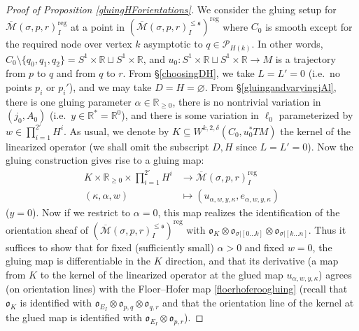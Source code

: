 \documentclass[12pt]{article}
\theoremstyle{definition}
\theoremstyle{remark}
\numberwithin{equation}{subsection}
\newcommand{\s}{\mathfrak s}
\newcommand{\oo}{\mathfrak o}
\newcommand{\RR}{\mathbb R}
\newcommand{\PPP}{\mathcal P}
\newcommand{\Mbar}{\overline{\mathcal M}}
\newcommand{\reg}{\mathrm{reg}}
\begin{document}
\begin{proof}[Proof of Proposition \ref{gluingHForientations}]
We consider the gluing setup for $\Mbar(\sigma,p,r)_I^\reg$ at a point in $(\Mbar(\sigma,p,r)^{\leq\s}_I)^\reg$ where $C_0$ is smooth except for the required node over vertex $k$ asymptotic to $q\in\PPP_{H(k)}$.  In other words, $C_0\setminus\{q_0,q_1,q_2\}=S^1\times\RR\sqcup S^1\times\RR$, and $u_0:S^1\times\RR\sqcup S^1\times\RR\to M$ is a trajectory from $p$ to $q$ and from $q$ to $r$.  From \S\ref{choosingDH}, we take $L=L'=0$ (i.e.\ no points $p_i$ or $p_i'$), and we may take $D=H=\varnothing$.  From \S\ref{gluingandvaryingjAl}, there is one gluing parameter $\alpha\in\RR_{\geq 0}$, there is no nontrivial variation in $(j_0,A_0)$ (i.e.\ $y\in\RR^\ast=\RR^0$), and there is some variation in $\ell_0$ parameterized by $w\in\prod_{i=1}^{2\prime}H^i$.  As usual, we denote by $K\subseteq W^{k,2,\delta}(C_0,u_0^\ast TM)$ the kernel of the linearized operator (we shall omit the subscript $D,H$ since $L=L'=0$).  Now the gluing construction gives rise to a gluing map:
\begin{align}
K\times\RR_{\geq 0}\times\prod_{i=1}^{2\prime}H^i&\to\Mbar(\sigma,p,r)_I^\reg\\
(\kappa,\alpha,w)&\mapsto(u_{\alpha,w,y,\kappa},e_{\alpha,w,y,\kappa})
\end{align}
($y=0$).  Now if we restrict to $\alpha=0$, this map realizes the identification of the orientation sheaf of $(\Mbar(\sigma,p,r)^{\leq\s}_I)^\reg$ with $\oo_K\otimes\oo_{\sigma|[0\ldots k]}\otimes\oo_{\sigma|[k\ldots n]}$.  Thus it suffices to show that for fixed (sufficiently small) $\alpha>0$ and fixed $w=0$, the gluing map is differentiable in the $K$ direction, and that its derivative (a map from $K$ to the kernel of the linearized operator at the glued map $u_{\alpha,w,y,\kappa}$) agrees (on orientation lines) with the Floer--Hofer map \eqref{floerhoferoogluing} (recall that $\oo_K$ is identified with $\oo_{E_I}\otimes\oo_{p,q}\otimes\oo_{q,r}$ and that the orientation line of the kernel at the glued map is identified with $\oo_{E_I}\otimes\oo_{p,r}$).


\end{proof}
\end{document}
